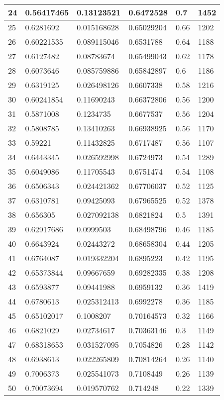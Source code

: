 \begin{longtable}{|l|l|l|l|l|l|}
24 & 0.56417465 & 0.13123521 & 0.6472528 & 0.7 & 1452 \\ \hline 
25 & 0.6281692 & 0.015168628 & 0.65029204 & 0.66 & 1202 \\ \hline 
26 & 0.60221535 & 0.089115046 & 0.6531788 & 0.64 & 1188 \\ \hline 
27 & 0.6127482 & 0.08783674 & 0.65499043 & 0.62 & 1178 \\ \hline 
28 & 0.6073646 & 0.085759886 & 0.65842897 & 0.6 & 1186 \\ \hline 
29 & 0.6319125 & 0.026498126 & 0.6607338 & 0.58 & 1216 \\ \hline 
30 & 0.60241854 & 0.11690243 & 0.66372806 & 0.56 & 1200 \\ \hline 
31 & 0.5871008 & 0.1234735 & 0.6677537 & 0.56 & 1204 \\ \hline 
32 & 0.5808785 & 0.13410263 & 0.66938925 & 0.56 & 1170 \\ \hline 
33 & 0.59221 & 0.11432825 & 0.6717487 & 0.56 & 1107 \\ \hline 
34 & 0.6443345 & 0.026592998 & 0.6724973 & 0.54 & 1289 \\ \hline 
35 & 0.6049086 & 0.11705543 & 0.6751474 & 0.54 & 1108 \\ \hline 
36 & 0.6506343 & 0.024421362 & 0.67706037 & 0.52 & 1125 \\ \hline 
37 & 0.6310781 & 0.09425093 & 0.67965525 & 0.52 & 1378 \\ \hline 
38 & 0.656305 & 0.027092138 & 0.6821824 & 0.5 & 1391 \\ \hline 
39 & 0.62917686 & 0.0999503 & 0.68498796 & 0.46 & 1185 \\ \hline 
40 & 0.6643924 & 0.02443272 & 0.68658304 & 0.44 & 1205 \\ \hline 
41 & 0.6764087 & 0.019332204 & 0.6895223 & 0.42 & 1195 \\ \hline 
42 & 0.65373844 & 0.09667659 & 0.69282335 & 0.38 & 1208 \\ \hline 
43 & 0.6593877 & 0.09441988 & 0.6959132 & 0.36 & 1419 \\ \hline 
44 & 0.6780613 & 0.025312413 & 0.6992278 & 0.36 & 1185 \\ \hline 
45 & 0.65102017 & 0.1008207 & 0.70164573 & 0.32 & 1166 \\ \hline 
46 & 0.6821029 & 0.02734617 & 0.70363146 & 0.3 & 1149 \\ \hline 
47 & 0.68318653 & 0.031527095 & 0.7054826 & 0.28 & 1142 \\ \hline 
48 & 0.6938613 & 0.022265809 & 0.70814264 & 0.26 & 1140 \\ \hline 
49 & 0.7006373 & 0.025541073 & 0.7108449 & 0.26 & 1139 \\ \hline 
50 & 0.70073694 & 0.019570762 & 0.714248 & 0.22 & 1339 \\ \hline 
\end{longtable}